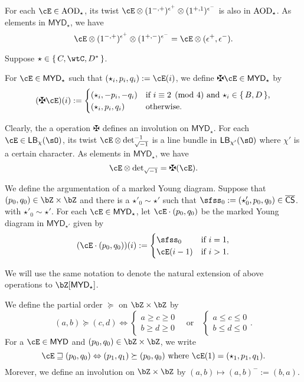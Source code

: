 \documentclass[12pt,a4paper]{amsart}
\def\MYD{{\mathsf{MYD}}}
\numberwithin{equation}{section}
\theoremstyle{remark}
\begin{document}
For each $\cE\in \AOD_{\star}$, its twist
$\cE\otimes  (1^{{-,+}})^{\epsilon^{+}}\otimes (1^{+,1})^{\epsilon^{-}}$
is also  in $\mathrm{AOD}_{\star}$.
As elements in $\MYD_{\star}$, we have
\[
  \cE\otimes  (1^{{-,+}})^{\epsilon^{+}}\otimes (1^{+,-})^{\epsilon^{-}} = \cE \otimes (\epsilon^{+},\epsilon^{-}).
\]

\medskip

Suppose $\star\in \set{C,\wtC,D^{*}}$.

For $\cE\in \MYD_{\star}$ such that $(\star_{i},p_{i},q_{i}):=\cE(i)$,
we define $\maltese\cE\in \MYD_{\star}$ by
\[
(\maltese\cE)(i) := \begin{cases}
  (\star_{i}, -p_{i},-q_{i})& \text{if $i\equiv 2 \pmod{4}$ and $\star_{i}\in \set{B,D}$,}\\
  (\star_{i}, p_{i},q_{i}) & \text{otherwise.}
\end{cases}
\]

Clearly, the a operation $\maltese$ defines an involution on
$\MYD_{\star}$.
For each $\cE\in \DCO{\chi}$, its twist  $\cE\otimes \deti^{-1}$
is a line bundle  in $\DCO{\chi'}$ where  $\chi'$ is a certain character. %
As elements in $\MYD_{\star}$, we have
\[
  \cE\otimes \deti = \maltese (\cE).
\]

We define the argumentation of a marked Young diagram.
Suppose that $(p_{0},q_{0})\in \bZ\times \bZ$ and there is a
$\star'_{0}\sim \star'$ such that
$\sfss_{0} := (\star'_{0},p_{0},q_{0})\in \CCSS$.
with $\star'_{0} \sim \star'$.
For each $\cE\in \MYD_{\star}$,
let $\cE\cdot (p_{0},q_{0})$ be the marked Young diagram in $\MYD_{\star'}$ given by
\[
  (\cE\cdot (p_{0},q_{0}))(i) :=
  \begin{cases}
    \sfss_{0} & \text{if } i=1,\\
    \cE(i-1) & \text{if } i>1.
  \end{cases}
\]

We will use the same notation to denote the  natural extension of above
operations to $\bZ[\MYD_{\star}]$.

We define the partial order $\succeq$ on $\bZ\times \bZ$ by
\[
  (a,b) \succeq (c,d) \Leftrightarrow
  \begin{cases}a\geq c\geq 0\\ b\geq d\geq 0\end{cases}
  \quad  \text{or} \quad
  \begin{cases} a\leq c\leq 0\\ b\leq d\leq 0 \end{cases}.
\]
For a $\cE\in \MYD$ and $(p_{0},q_{0})\in \bZ\times \bZ$, we write
\[
  \cE\sqsupseteq (p_{0},q_{0}) \Leftrightarrow
  (p_{1},q_{1})\succeq (p_{0},q_{0})
  \text{ where }\cE(1) = (\star_{1},p_{1},q_{1}).
\]
Morever, we define an involution on $\bZ\times \bZ$ %
by
$(a,b)\mapsto (a,b)^{-}:=(b,a)$.
\end{document}
